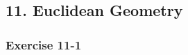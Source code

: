{\begin{multicols}{3}
\begin{enumerate}[noitemsep, label=\textbf{\arabic*}. ]
\end{enumerate}
\end{multicols}



\subsection* {11. Euclidean Geometry}
\begin{multicols}{3}
\subsubsection*{Exercise 11-1} %
       

\end{multicols}}
